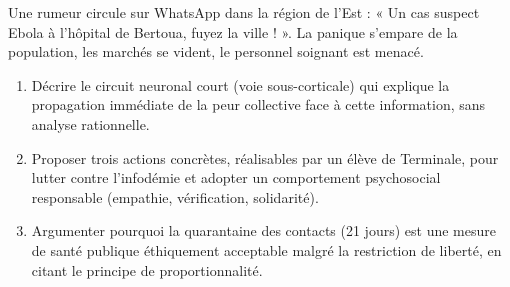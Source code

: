 \documentclass[11pt]{article}
\begin{document}
\begin{exercice}
Une rumeur circule sur WhatsApp dans la région de l'Est : « Un cas suspect Ebola à l'hôpital de Bertoua, fuyez la ville ! ». La panique s'empare de la population, les marchés se vident, le personnel soignant est menacé.
\begin{enumerate}
    \item Décrire le circuit neuronal court (voie sous-corticale) qui explique la propagation immédiate de la peur collective face à cette information, sans analyse rationnelle.
    \item Proposer trois actions concrètes, réalisables par un élève de Terminale, pour lutter contre l'infodémie et adopter un comportement psychosocial responsable (empathie, vérification, solidarité).
    \item Argumenter pourquoi la quarantaine des contacts (21 jours) est une mesure de santé publique éthiquement acceptable malgré la restriction de liberté, en citant le principe de proportionnalité.
\end{enumerate}
\end{exercice}
\end{document}
